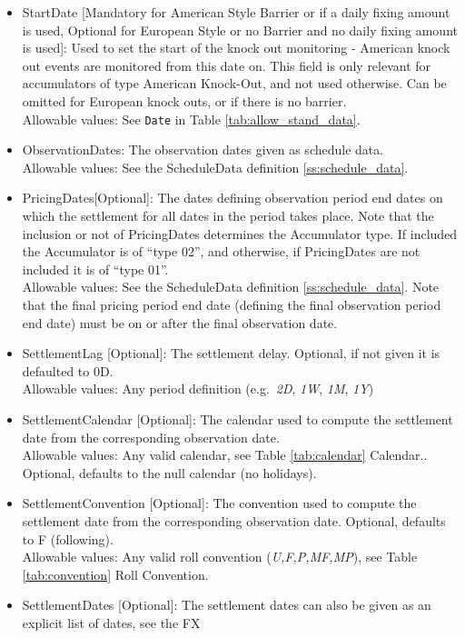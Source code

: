 \begin{itemize}
\item StartDate [Mandatory for American Style Barrier or if a daily fixing amount is used, Optional for European Style or no Barrier and no daily fixing amount is used]:  Used to set the start of the knock out monitoring -  American knock out events are monitored from this
  date on. This field is only relevant for accumulators of type American Knock-Out, and not used otherwise. Can be
  omitted for European knock outs, or if there is no barrier. \\
    Allowable values: See \lstinline!Date! in Table \ref{tab:allow_stand_data}.
\item ObservationDates: The observation dates given as schedule data.\\
    Allowable values: See the ScheduleData definition \ref{ss:schedule_data}.
\item PricingDates[Optional]: The dates defining observation period end dates on which the settlement for all dates in the period
  takes place. Note that the inclusion or not of PricingDates determines  the Accumulator type.  If included the Accumulator is of ``type 02'', and otherwise,  if PricingDates are not included it is of ``type 01''.\\
    Allowable values: See the ScheduleData definition \ref{ss:schedule_data}. Note that the final pricing period end date (defining the final observation period end date) must be on or after the final observation date.
  \item SettlementLag [Optional]: The settlement delay. Optional, if not given it is defaulted to 0D.\\
    Allowable values: Any period definition (e.g.\ \emph{2D}, \emph{1W}, \emph{1M}, \emph{1Y})
\item SettlementCalendar [Optional]: The calendar used to compute the settlement date from the corresponding observation date.\\
    Allowable values: Any valid calendar, see Table \ref{tab:calendar} Calendar.. Optional, defaults to the null calendar (no holidays).
\item SettlementConvention [Optional]: The convention used to compute the settlement date from the corresponding observation
  date. Optional, defaults to F (following). \\
  Allowable values: Any valid roll convention (\emph{U,F,P,MF,MP}), see Table \ref{tab:convention} Roll Convention.
\item SettlementDates [Optional]: The settlement dates can also be given as an explicit list of dates, see the FX

\end{itemize}
